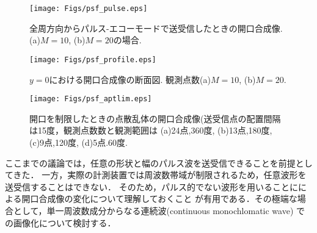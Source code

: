 \begin{figure}[h]
	\begin{center}
	\texttt{[image: Figs/psf\_pulse.eps]} 
	\end{center}
	\caption{全周方向からパルス-エコーモードで送受信したときの開口合成像.(a)$M=10$, (b)$M=20$の場合.} 
	\label{fig:XXX_psf_pulse}
\end{figure}
\begin{figure}[h]
	\begin{center}
	\texttt{[image: Figs/psf\_profile.eps]} 
	\end{center}
	\caption{$y=0$における開口合成像の断面図. 観測点数(a)$M=10$, (b)$M=20$.}
	\label{fig:XXX_psf_profile} 
\end{figure}
\begin{figure}[h]
	\begin{center}
	\texttt{[image: Figs/psf\_aptlim.eps]} 
	\end{center}
	\caption{開口を制限したときの点散乱体の開口合成像(送受信点の配置間隔は15度，観測点数数と観測範囲は
	(a)24点,360度, (b)13点,180度, (c)9点,120度, (d)5点.60度.} 
	\label{fig:XXX_100}
\end{figure}
ここまでの議論では，任意の形状と幅のパルス波を送受信できることを前提としてきた．
一方，実際の計測装置では周波数帯域が制限されるため，任意波形を送受信することはできない．
そのため，パルス的でない波形を用いることにによる開口合成像の変化について理解しておくこと
が有用である．その極端な場合として，単一周波数成分からなる連続波(continuous monochlomatic wave)
での画像化について検討する．

